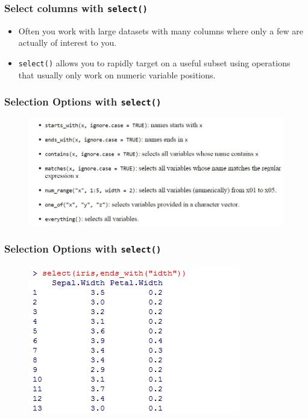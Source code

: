 \documentclass{beamer}
\begin{document}
\begin{frame}
	\frametitle{Select columns with \texttt{select()}}
	\LARGE
	\vspace{-1cm}
	\begin{itemize}
		\item Often you work with large datasets with many columns where only a few are actually of interest to you. 
		\item \texttt{select()} allows you to rapidly target on a useful subset using operations that usually only work on numeric variable positions.
	\end{itemize}
\end{frame}

\begin{frame}
	\frametitle{Selection Options with \texttt{select()}}
	\begin{figure}
		\centering
		\includegraphics[width=01.25\linewidth]{images/selectoptions}
	\end{figure}
	
\end{frame}
\begin{frame}
	\frametitle{Selection Options with \texttt{select()}}
	
	\begin{figure}
		\centering
		\includegraphics[width=0.89\linewidth]{images/selectendswith}
	\end{figure}
	
\end{frame}
\end{document}
